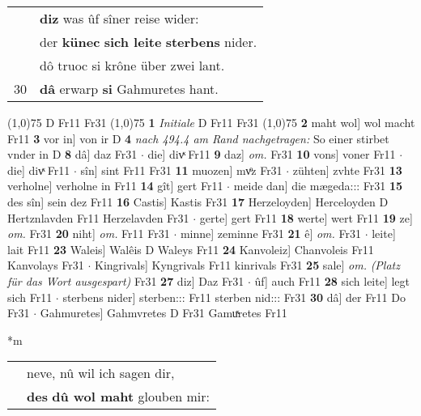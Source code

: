\documentclass[8pt,a4paper,notitlepage]{article}
\begin{document}
\begin{table}[ht]
\begin{minipage}[t]{0.5\linewidth}
\begin{tabular}{rl}
 & \textbf{diz} was ûf sîner reise wider:\\ 
 & der \textbf{künec} \textbf{sich leite} \textbf{sterbens} nider.\\ 
 & dô truoc si krône über zwei lant.\\ 
30 & \textbf{dâ} erwarp \textbf{si} Gahmuretes hant.\\ 
\end{tabular}
\scriptsize
\line(1,0){75} \newline
D Fr11 Fr31 \newline
\line(1,0){75} \newline
\textbf{1} \textit{Initiale} D Fr11 Fr31  \newline
\line(1,0){75} \newline
\textbf{2} maht wol] wol macht Fr11 \textbf{3} vor in] von ir D \textbf{4} \textit{nach 494.4 am Rand nachgetragen:} So einer stirbet vnder in D  \textbf{8} dâ] daz Fr31  $\cdot$ die] divͯ Fr11 \textbf{9} daz] \textit{om.} Fr31 \textbf{10} vons] voner Fr11  $\cdot$ die] divͯ Fr11  $\cdot$ sîn] sint Fr11 Fr31 \textbf{11} muozen] mvͦz Fr31  $\cdot$ zühten] zvhte Fr31 \textbf{13} verholne] verholne in Fr11 \textbf{14} gît] gert Fr11  $\cdot$ meide dan] die mægeda::: Fr31 \textbf{15} des sîn] sein dez Fr11 \textbf{16} Castis] Kastis Fr31 \textbf{17} Herzeloyden] Herceloyden D Hertznlavden Fr11 Herzelavden Fr31  $\cdot$ gerte] gert Fr11 \textbf{18} werte] wert Fr11 \textbf{19} ze] \textit{om.} Fr31 \textbf{20} niht] \textit{om.} Fr11 Fr31  $\cdot$ minne] zeminne Fr31 \textbf{21} ê] \textit{om.} Fr31  $\cdot$ leite] lait Fr11 \textbf{23} Waleis] Walêis D Waleys Fr11 \textbf{24} Kanvoleiz] Chanvoleis Fr11 Kanvolays Fr31  $\cdot$ Kingrivals] Kyngrivals Fr11 kinrivals Fr31 \textbf{25} sale] \textit{om.} \textit{(Platz für das Wort ausgespart)} Fr31 \textbf{27} diz] Daz Fr31  $\cdot$ ûf] auch Fr11 \textbf{28} sich leite] legt sich Fr11  $\cdot$ sterbens nider] sterben::: Fr11 sterben nid::: Fr31 \textbf{30} dâ] der Fr11 Do Fr31  $\cdot$ Gahmuretes] Gahmvretes D Fr31 Gamuͯretes Fr11 \newline
\end{minipage}
\hspace{0.5cm}
\begin{minipage}[t]{0.5\linewidth}
\small
\begin{center}*m
\end{center}
\begin{tabular}{rl}
 & neve, nû wil ich sagen dir,\\ 
 & \textbf{des} \textbf{dû wol maht} glouben mir:\\ 

\end{tabular}
\end{minipage}
\end{table}
\end{document}
